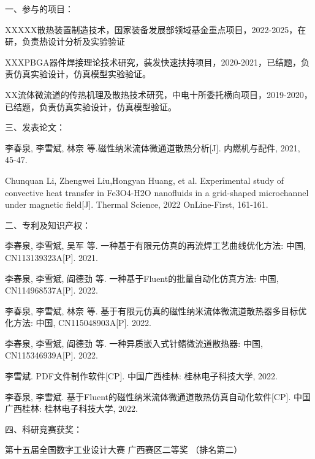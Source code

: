 \noindent %
一、参与的项目：
\begingroup
\setlength{\itemsep}{0bp}\setlength{\parskip}{0pt}\small
    \begin{enumerate}[label={[\arabic*]}] %
        \item XXXXX散热装置制造技术，国家装备发展部领域基金重点项目，2022-2025，在研，负责热设计分析及实验验证
        \item XXXPBGA器件焊接理论技术研究，装发快速扶持项目，2020-2021，已结题，负责仿真实验设计，仿真模型实验验证。
        \item XX流体微流道的传热机理及散热技术研究，中电十所委托横向项目，2019-2020，已结题，负责仿真实验设计，仿真模型验证。
        \end{enumerate}
\endgroup
\vspace{3mm}

\noindent %
三、发表论文：
\begingroup
\setlength{\itemsep}{0bp}\setlength{\parskip}{0pt}\small
    \begin{enumerate}[label={[\arabic*]}]  
        \item 李春泉, 李雪斌, 林奈 等.磁性纳米流体微通道散热分析[J]. 内燃机与配件, 2021, 45-47. 
        \item {Chunquan Li}, {Zhengwei Liu},{Hongyan Huang}, et al. Experimental study of convective heat transfer in {{Fe3O4-H2O}} nanofluids in a grid-shaped microchannel under magnetic field[J]. Thermal Science, 2022 OnLine-First, 161-161.
    \end{enumerate}
\endgroup
\vspace{3mm}

\noindent %
二、专利及知识产权：
\begingroup
\setlength{\itemsep}{0bp}\setlength{\parskip}{0pt}\small
    \begin{enumerate}[label={[\arabic*]}]  
        \item 李春泉, 李雪斌, 吴军 等. 一种基于有限元仿真的再流焊工艺曲线优化方法: 中国, CN113139323A[P]. 2021. 
        \item 李春泉, 李雪斌, 阎德劲 等.
        {一种基于Fluent的批量自动化仿真方法}: 中国, CN114968537A[P].
        2022.
        \item 李春泉, 李雪斌, 林奈 等. 基于有限元仿真的磁性纳米流体微流道散热器多目标优化方法: 中国, CN115048903A[P]. 2022.
        \item 李春泉, 李雪斌, 阎德劲 等. 一种异质嵌入式针鳍微流道散热器: 中国, CN115346939A[P]. 2022.
        \item 李雪斌. {PDF文件制作软件}[CP]. 中国广西桂林: 桂林电子科技大学, 2022.
        \item 李春泉, 李雪斌. 基于Fluent的磁性纳米流体微通道散热仿真自动化软件[CP]. 中国广西桂林: 桂林电子科技大学, 2022.
    \end{enumerate}
\endgroup
\vspace{3mm}

\noindent %
四、科研竞赛获奖：
\begingroup
    \setlength{\itemsep}{0bp}\setlength{\parskip}{0pt}\small
    \begin{enumerate}[label={[\arabic*]}]  
        \item 第十五届全国数字工业设计大赛 广西赛区二等奖 （排名第二）   
    \end{enumerate}
\endgroup



